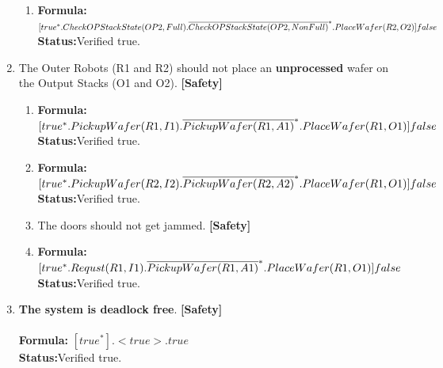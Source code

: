 \documentclass[a4paper,12pt]{article}
\begin{document}
\begin{enumerate}
\begin{enumerate}
			\item \textbf{Formula:} $[true^* . CheckOPStackState(OP2,Full). \\\overline{CheckOPStackState(OP2, NonFull)}^* .PlaceWafer(R2, O2)] false $
			\\\textbf{Status:}Verified true.
		\end{enumerate}
		\item The Outer Robots (R1 and R2) should not place an \textbf{unprocessed} wafer on the Output Stacks (O1 and O2). \textbf{[Safety]}
		\begin{enumerate}
			
			\item \textbf{Formula:} $[true^* . PickupWafer(R1, I1) .\overline{PickupWafer(R1, A1)}^* . 
			\\PlaceWafer(R1, O1)] false $
			\\\textbf{Status:}Verified true.
			
			\item \textbf{Formula:} $[true^* . PickupWafer(R2, I2) .\overline{PickupWafer(R2, A2)}^* . 
			\\PlaceWafer(R1, O1)] false $
			\\\textbf{Status:}Verified true.
			
			
			\item The doors should not get jammed. \textbf{[Safety]}
			\item \textbf{Formula:} $[true^* . Requst(R1, I1) .\overline{PickupWafer(R1, A1)}^* . 
			\\PlaceWafer(R1, O1)] false $
			\\\textbf{Status:}Verified true.
			
		\end{enumerate}
		\item \textbf{The system is deadlock free}. \textbf{[Safety]}
		\\
		\\\textbf{Formula:} $[true^*]. <true> . true$
		\\\textbf{Status:}Verified true.
	\end{enumerate}
	
\end{document}
